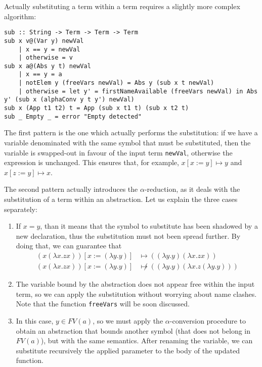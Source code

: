 \documentclass{article}
\begin{document}
Actually substituting a term within a term requires a slightly more complex algorithm:

\begin{lstlisting}
sub :: String -> Term -> Term -> Term
sub x v@(Var y) newVal
    | x == y = newVal
    | otherwise = v
sub x a@(Abs y t) newVal
    | x == y = a
    | notElem y (freeVars newVal) = Abs y (sub x t newVal)
    | otherwise = let y' = firstNameAvailable (freeVars newVal) in Abs y' (sub x (alphaConv y t y') newVal)
sub x (App t1 t2) t = App (sub x t1 t) (sub x t2 t)
sub _ Empty _ = error "Empty detected"
\end{lstlisting}

The first pattern is the one which actually performs the substitution: if we have a variable denominated with the same symbol that must be substituted, then the variable is swapped-out in favour of the input term \lstinline|newVal|, otherwise the expression is unchanged. This ensures that, for example, $x[x:=y] \mapsto y$ and $x[z:=y] \mapsto x$.

The second pattern actually introduces the $\alpha$-reduction, as it deals with the substitution of a term within an abstraction. Let us explain the three cases separately:

\begin{enumerate}
    \item If $x=y$, than it means that the symbol to substitute has been shadowed by a new declaration, thus the substitution must not been spread further. By doing that, we can guarantee that
    \begin{align*}
        (x (\lambda x . z x))[x := (\lambda y . y)] &\mapsto ((\lambda y . y) (\lambda x . z x))\\
        (x (\lambda x . z x))[x := (\lambda y . y)] &\not \mapsto ((\lambda y . y) (\lambda x . z (\lambda y . y)))
    \end{align*}
    \item The variable bound by the abstraction does not appear free within the input term, so we can apply the substitution without worrying about name clashes. Note that the function \lstinline|freeVars| will be soon discussed.
    \item In this case, $y \in FV(a)$, so we must apply the $\alpha$-conversion procedure to obtain an abstraction that bounds another symbol (that does not belong in $FV(a)$), but with the same semantics. After renaming the variable, we can substitute recursively the applied parameter to the body of the updated function.
\end{enumerate}
\end{document}
